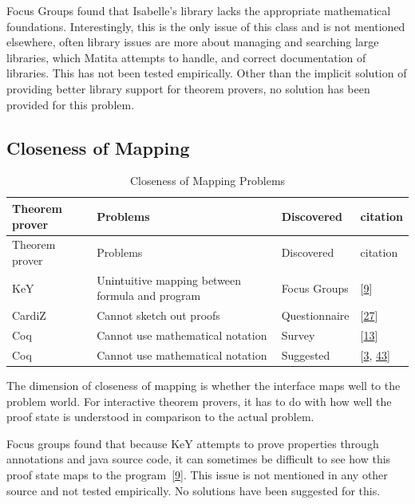 \documentclass[
]{article}
\begin{document}
Focus Groups found that Isabelle's library lacks the appropriate
mathematical foundations. Interestingly, this is the only issue of this
class and is not mentioned elsewhere, often library issues are more
about managing and searching large libraries, which Matita attempts to
handle, and correct documentation of libraries. This has not been tested
empirically. Other than the implicit solution of providing better
library support for theorem provers, no solution has been provided for
this problem.

\hypertarget{closeness-of-mapping-1}{%
\subsection{Closeness of Mapping}\label{closeness-of-mapping-1}}

\hypertarget{tbl:closeness_of_mapping}{}
\begin{longtable}[]{@{}llll@{}}
\caption{\label{tbl:closeness_of_mapping}Closeness of Mapping
Problems}\tabularnewline
\toprule
Theorem prover & Problems & Discovered & citation \\
\midrule
\endfirsthead
\toprule
Theorem prover & Problems & Discovered & citation \\
\midrule
\endhead
KeY & Unintuitive mapping between formula and program & Focus Groups &
{[}\protect\hyperlink{ref-beckert_usability_2015}{9}{]} \\
CardiZ & Cannot sketch out proofs & Questionnaire &
{[}\protect\hyperlink{ref-kadoda_cognitive_2000}{27}{]} \\
Coq & Cannot use mathematical notation & Survey &
{[}\protect\hyperlink{ref-berman_development_2014}{13}{]} \\
Coq & Cannot use mathematical notation & Suggested &
{[}\protect\hyperlink{ref-asperti_user_2007}{3},
\protect\hyperlink{ref-zacchiroli_user_2007}{43}{]} \\
\bottomrule
\end{longtable}

The dimension of closeness of mapping is whether the interface maps well
to the problem world. For interactive theorem provers, it has to do with
how well the proof state is understood in comparison to the actual
problem.

Focus groups found that because KeY attempts to prove properties through
annotations and java source code, it can sometimes be difficult to see
how this proof state maps to the
program~{[}\protect\hyperlink{ref-beckert_usability_2015}{9}{]}. This
issue is not mentioned in any other source and not tested empirically.
No solutions have been suggested for this.
\end{document}
